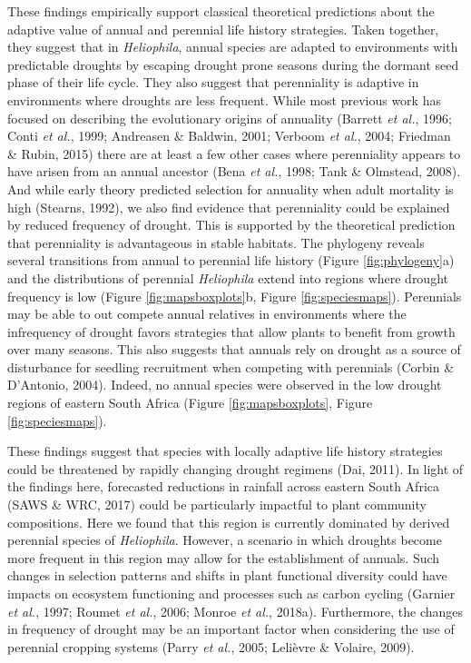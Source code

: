 \documentclass[man,floatsintext]{apa6}
\theoremstyle{definition}
\theoremstyle{definition}
\theoremstyle{definition}
\theoremstyle{remark}
\begin{document}
These findings empirically support classical theoretical predictions
about the adaptive value of annual and perennial life history
strategies. Taken together, they suggest that in \emph{Heliophila},
annual species are adapted to environments with predictable droughts by
escaping drought prone seasons during the dormant seed phase of their
life cycle. They also suggest that perenniality is adaptive in
environments where droughts are less frequent. While most previous work
has focused on describing the evolutionary origins of annuality (Barrett
\emph{et al.}, 1996; Conti \emph{et al.}, 1999; Andreasen \& Baldwin,
2001; Verboom \emph{et al.}, 2004; Friedman \& Rubin, 2015) there are at
least a few other cases where perenniality appears to have arisen from
an annual ancestor (Bena \emph{et al.}, 1998; Tank \& Olmstead, 2008).
And while early theory predicted selection for annuality when adult
mortality is high (Stearns, 1992), we also find evidence that
perenniality could be explained by reduced frequency of drought. This is
supported by the theoretical prediction that perenniality is
advantageous in stable habitats. The phylogeny reveals several
transitions from annual to perennial life history (Figure
\ref{fig:phylogeny}a) and the distributions of perennial
\emph{Heliophila} extend into regions where drought frequency is low
(Figure \ref{fig:mapsboxplots}b, Figure \ref{fig:speciesmaps}).
Perennials may be able to out compete annual relatives in environments
where the infrequency of drought favors strategies that allow plants to
benefit from growth over many seasons. This also suggests that annuals
rely on drought as a source of disturbance for seedling recruitment when
competing with perennials (Corbin \& D'Antonio, 2004). Indeed, no annual
species were observed in the low drought regions of eastern South Africa
(Figure \ref{fig:mapsboxplots}, Figure \ref{fig:speciesmaps}).

These findings suggest that species with locally adaptive life history
strategies could be threatened by rapidly changing drought regimens
(Dai, 2011). In light of the findings here, forecasted reductions in
rainfall across eastern South Africa (SAWS \& WRC, 2017) could be
particularly impactful to plant community compositions. Here we found
that this region is currently dominated by derived perennial species of
\emph{Heliophila}. However, a scenario in which droughts become more
frequent in this region may allow for the establishment of annuals. Such
changes in selection patterns and shifts in plant functional diversity
could have impacts on ecosystem functioning and processes such as carbon
cycling (Garnier \emph{et al.}, 1997; Roumet \emph{et al.}, 2006; Monroe
\emph{et al.}, 2018a). Furthermore, the changes in frequency of drought
may be an important factor when considering the use of perennial
cropping systems (Parry \emph{et al.}, 2005; Lelièvre \& Volaire, 2009).
\end{document}
